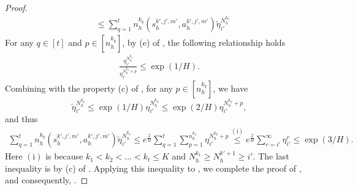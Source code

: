 \documentclass{article}
\begin{document}
\begin{proof}
\begin{align}
    &\leq \sum_{q=1}^{t} n_h^{k_q}(s_h^{k',j',m'}, a_h^{k',j',m'})\tilde{\eta}_{i'}^{N_h^{k_q}}
\end{align}
For any $q \in [t]$ and $p \in [n_h^{k_q}]$, by (e) of , the following relationship holds
\begin{align}
\label{continue}
    \frac{\eta_{i'}^{N_h^{k_q}}}{\eta_{i'}^{N_h^{k_q}+p}}  \leq \exp(1/H).
\end{align}
Combining  with the property (c) of , for any $p \in [n_h^{k_q}]$, we have
$$\tilde{\eta}_{i'}^{N_h^{k_q}} \leq \exp(1/H)\eta_{i'}^{N_h^{k_q}} \leq \exp(2/H)\eta_{i'}^{N_h^{k_q}+p},$$
and thus
\begin{align}
\label{sumnNeta}
    \sum_{q=1}^{t} n_h^{k_q}(s_h^{k',j',m'}, a_h^{k',j',m'})\tilde{\eta}_{i'}^{N_h^{k_q}} \leq e^{\frac{2}{H}}\sum_{q=1}^{t}\sum_{p=1}^{n_h^{k_q}}\eta_{i'}^{N_h^{k_q}+p} \overset{(\mathrm{i})}{\leq} e^{\frac{2}{H}} \sum_{r = i'}^{\infty}\eta_{i'}^{r} \leq \exp(3/H).
\end{align}
Here $(\mathrm{i})$ is because $k_1 <k_2 < ... < k_t \leq K$ and $N_h^{k_1} \geq N_h^{k'+1} \geq i'$. The last inequality is by (c) of . Applying this inequality to , we complete the proof of , and consequently, .
\end{proof}
\end{document}
